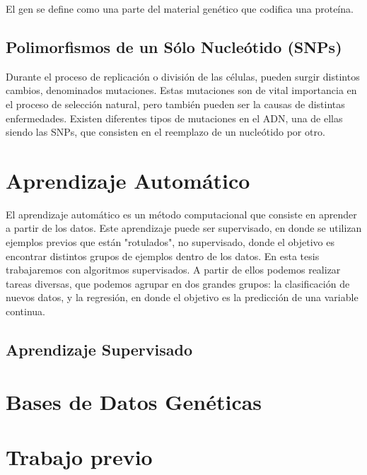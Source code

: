 El gen se define como una parte del material genético que codifica una proteína. 


\subsection{Polimorfismos de un Sólo Nucleótido (SNPs)}

Durante el proceso de replicación o división de las células, pueden surgir distintos cambios, denominados mutaciones. Estas mutaciones son de vital importancia en el proceso de selección natural, pero también pueden ser la causas de distintas enfermedades. Existen diferentes tipos de mutaciones en el ADN, una de ellas siendo las SNPs, que consisten en el reemplazo de un nucleótido por otro.


\section{Aprendizaje Automático}

El aprendizaje automático es un método computacional que consiste en aprender a partir de los datos. Este aprendizaje puede ser supervisado, en donde se utilizan ejemplos previos que están "rotulados", no supervisado, donde el objetivo es encontrar distintos grupos de ejemplos dentro de los datos. En esta tesis trabajaremos con algoritmos supervisados. A partir de ellos podemos realizar tareas diversas, que podemos agrupar en dos grandes grupos: la clasificación de nuevos datos, y la regresión, en donde el objetivo es la predicción de una variable continua. 

\subsection{Aprendizaje Supervisado}


\section{Bases de Datos Genéticas}

\section{Trabajo previo}

